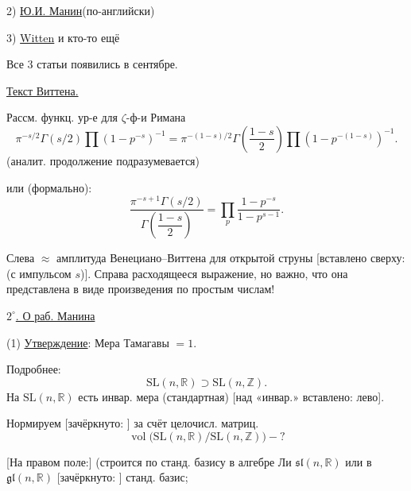 2) \underline{Ю.И. Манин}\qquad (по-английски)

3) \underline{Witten} и кто-то ещё

Все 3 статьи появились в сентябре.

\underline{Текст Виттена.}

Рассм. функц. ур-е для $\zeta$-ф-и Римана
\begin{equation}
 \pi^{-s/2}\Gamma(s/2)\prod(1-p^{-s})^{-1}
 =
 \pi^{-(1-s)/2}\Gamma\left(\frac{1-s}{2}\right)
 \prod(1-p^{-(1-s)})^{-1}.
 \tag{2}
\end{equation}
(аналит. продолжение подразумевается)

или (формально):
\begin{equation}
 \frac{\pi^{-s+1}\Gamma(s/2)}
 {\Gamma\left(\dfrac{1-s}{2}\right)}
 =
 \prod_p\frac{1-p^{-s}}{1-p^{s-1}}.
 \tag{3}
\end{equation}

Слева $\approx$ амплитуда Венециано–Виттена для открытой
струны [вставлено сверху: (с импульсом $s$)].
Справа расходящееся выражение, но важно,
что она представлена в виде произведения по простым числам!


\underline{$2^{\circ}$. О раб. Манина}

(1) \underline{Утверждение}: Мера Тамагавы $=1$.

Подробнее:
\begin{equation*}
 \mathrm{SL}(n,\mathbb R)\supset\mathrm{SL}(n,\mathbb Z).
\end{equation*}
На $\mathrm{SL}(n,\mathbb R)$ есть инвар. мера (стандартная)
[над «инвар.» вставлено: лево].

Нормируем [зачёркнуто:
]
за счёт целочисл. матриц.
\begin{equation*}
 \operatorname{vol}\bigl(\mathrm{SL}(n,\mathbb R)/\mathrm{SL}(n,\mathbb Z)\bigr)-?
\end{equation*}

[На правом поле:]
(строится по станд. базису в алгебре Ли
$\mathfrak{sl}(n,\mathbb R)$ или в $\mathfrak{gl}(n,\mathbb R)$
[зачёркнуто: ]
станд. базис;
\begin{center}
\end{center}

